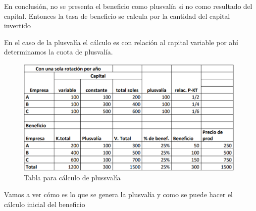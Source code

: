 \documentclass[
  letterpaper,
  DIV=11,
  numbers=noendperiod]{scrartcl}
\begin{document}
En conclusión, no se presenta el beneficio como plusvalía si no como
resultado del capital. Entonces la tasa de beneficio se calcula por la
cantidad del capital invertido

En el caso de la plusvalía el cálculo es con relación al capital
variable por ahí determinamos la cuota de plusvalía.

\begin{figure}

\caption{\label{fig-figura1}Tabla para cálculo de plussvalía}

{\centering \includegraphics{Figura1.png}

}

\end{figure}

Vamos a ver cómo es lo que se genera la plusvalía y como se puede hacer
el cálculo inicial del beneficio
\end{document}
